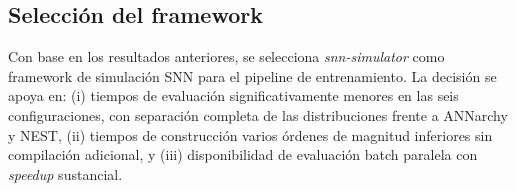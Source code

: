 


\subsection{Selección del framework}

Con base en los resultados anteriores, se selecciona \textit{snn-simulator} como framework de simulación SNN para el pipeline de entrenamiento. La decisión se apoya en: (i) tiempos de evaluación significativamente menores en las seis configuraciones, con separación completa de las distribuciones frente a ANNarchy y NEST, (ii) tiempos de construcción varios órdenes de magnitud inferiores sin compilación adicional, y (iii) disponibilidad de evaluación batch paralela con \textit{speedup} sustancial.

